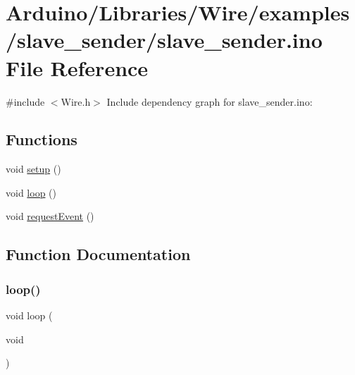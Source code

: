 \hypertarget{slave__sender_8ino}{}\section{Arduino/\+Libraries/\+Wire/examples/slave\+\_\+sender/slave\+\_\+sender.ino File Reference}
\label{slave__sender_8ino}
{\ttfamily \#include $<$Wire.\+h$>$}\newline
Include dependency graph for slave\+\_\+sender.\+ino\+:
\subsection*{Functions}
\begin{DoxyCompactItemize}
\item 
void \hyperlink{slave__sender_8ino_a4fc01d736fe50cf5b977f755b675f11d}{setup} ()
\item 
void \hyperlink{slave__sender_8ino_afe461d27b9c48d5921c00d521181f12f}{loop} ()
\item 
void \hyperlink{slave__sender_8ino_ac10b80b8aaeaf66cecbf0bb5eff5ae33}{request\+Event} ()
\end{DoxyCompactItemize}


\subsection{Function Documentation}
\mbox{\label{slave__sender_8ino_afe461d27b9c48d5921c00d521181f12f}} 
\subsubsection{\texorpdfstring{loop()}{loop()}}
{\footnotesize\ttfamily void loop (\begin{DoxyParamCaption}\item[{void}]{ }\end{DoxyParamCaption})}

\mbox{\label{slave__sender_8ino_ac10b80b8aaeaf66cecbf0bb5eff5ae33}} 
